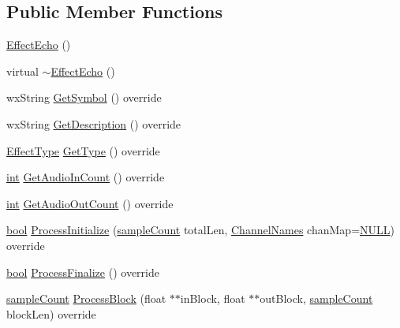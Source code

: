 \subsection*{Public Member Functions}
\begin{DoxyCompactItemize}
\item 
\hyperlink{class_effect_echo_a14bc2837819010329a864e22542839e2}{Effect\+Echo} ()
\item 
virtual \hyperlink{class_effect_echo_ad948ecd603c10510f9edd03c8bb7c868}{$\sim$\+Effect\+Echo} ()
\item 
wx\+String \hyperlink{class_effect_echo_a9b199385643e6d85b652afd00a973145}{Get\+Symbol} () override
\item 
wx\+String \hyperlink{class_effect_echo_a44bee8d8f1ddff6eba4cd474ed680412}{Get\+Description} () override
\item 
\hyperlink{_effect_interface_8h_a4809a7bb3fd1a421902a667cc1405d43}{Effect\+Type} \hyperlink{class_effect_echo_a927ac7c210d15d7aa8096cd21dd399a3}{Get\+Type} () override
\item 
\hyperlink{xmltok_8h_a5a0d4a5641ce434f1d23533f2b2e6653}{int} \hyperlink{class_effect_echo_a276a9ad0b1b7af81eb750c16e681e8a9}{Get\+Audio\+In\+Count} () override
\item 
\hyperlink{xmltok_8h_a5a0d4a5641ce434f1d23533f2b2e6653}{int} \hyperlink{class_effect_echo_a048024ac99fe84e81b136b16015cbc3e}{Get\+Audio\+Out\+Count} () override
\item 
\hyperlink{mac_2config_2i386_2lib-src_2libsoxr_2soxr-config_8h_abb452686968e48b67397da5f97445f5b}{bool} \hyperlink{class_effect_echo_a2cc8ae3ee610674c8098ce427dbdbaf3}{Process\+Initialize} (\hyperlink{include_2audacity_2_types_8h_afa427e1f521ea5ec12d054e8bd4d0f71}{sample\+Count} total\+Len, \hyperlink{include_2audacity_2_types_8h_a4f0f42a04250c39bbe0ce6cb26aa3b48}{Channel\+Names} chan\+Map=\hyperlink{px__mixer_8h_a070d2ce7b6bb7e5c05602aa8c308d0c4}{N\+U\+LL}) override
\item 
\hyperlink{mac_2config_2i386_2lib-src_2libsoxr_2soxr-config_8h_abb452686968e48b67397da5f97445f5b}{bool} \hyperlink{class_effect_echo_a6c66e208cd8003cedfd60f3a8e8dbee0}{Process\+Finalize} () override
\item 
\hyperlink{include_2audacity_2_types_8h_afa427e1f521ea5ec12d054e8bd4d0f71}{sample\+Count} \hyperlink{class_effect_echo_a79450b48e290c148a46a308b8bb1790d}{Process\+Block} (float $\ast$$\ast$in\+Block, float $\ast$$\ast$out\+Block, \hyperlink{include_2audacity_2_types_8h_afa427e1f521ea5ec12d054e8bd4d0f71}{sample\+Count} block\+Len) override

\end{DoxyCompactItemize}
